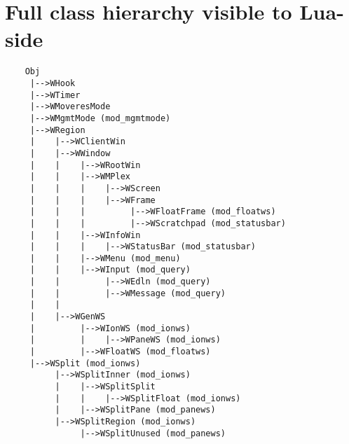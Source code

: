 \chapter{Full class hierarchy visible to Lua-side}
\label{app:fullhierarchy}
  
{\small
\begin{verbatim}
    Obj
     |-->WHook
     |-->WTimer
     |-->WMoveresMode
     |-->WMgmtMode (mod_mgmtmode)
     |-->WRegion
     |    |-->WClientWin
     |    |-->WWindow
     |    |    |-->WRootWin
     |    |    |-->WMPlex
     |    |    |    |-->WScreen
     |    |    |    |-->WFrame
     |    |    |         |-->WFloatFrame (mod_floatws)
     |    |    |         |-->WScratchpad (mod_statusbar)
     |    |    |-->WInfoWin
     |    |    |    |-->WStatusBar (mod_statusbar)
     |    |    |-->WMenu (mod_menu)
     |    |    |-->WInput (mod_query)
     |    |         |-->WEdln (mod_query)
     |    |         |-->WMessage (mod_query)
     |    |
     |    |-->WGenWS
     |         |-->WIonWS (mod_ionws)
     |         |    |-->WPaneWS (mod_ionws)
     |         |-->WFloatWS (mod_floatws)
     |-->WSplit (mod_ionws)
          |-->WSplitInner (mod_ionws)
          |    |-->WSplitSplit
          |    |    |-->WSplitFloat (mod_ionws)
          |    |-->WSplitPane (mod_panews)
          |-->WSplitRegion (mod_ionws)
               |-->WSplitUnused (mod_panews)
\end{verbatim}
}

